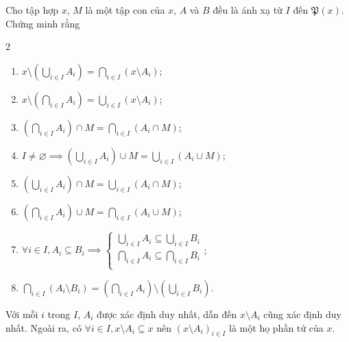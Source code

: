 \exercise Cho tập hợp $x$, $M$ là một tập con của $x$, $A$ và $B$ đều là ánh xạ từ $I$ đến $\mathfrak{P}(x)$. Chứng minh rằng
\begin{multicols}{2}
   \begin{enumerate}
      \item $x \setminus \left(\bigcup_{i \in I}A_i\right) = \bigcap_{i \in I}(x \setminus A_i)$;
      \item $x \setminus \left(\bigcap_{i \in I}A_i\right) = \bigcup_{i \in I}(x \setminus A_i)$;
      \item $\left(\bigcap_{i \in I}A_i\right) \cap M = \bigcap_{i \in I}\left(A_i \cap M\right)$;
      \item $I \neq \varnothing \implies \left(\bigcup_{i \in I}A_i\right) \cup M = \bigcup_{i \in I}\left(A_i \cup M\right)$;
      \item $\left(\bigcup_{i \in I}A_i\right) \cap M = \bigcup_{i \in I}\left(A_i \cap M\right)$;
      \item $\left(\bigcap_{i \in I}A_i\right) \cup M = \bigcap_{i \in I}\left(A_i \cup M\right)$;
      \item $\forall i \in I, A_i \subseteq B_i \implies \begin{cases}
         \bigcup_{i \in I} A_i \subseteq \bigcup_{i \in I}B_i \\
         \bigcap_{i \in I} A_i \subseteq \bigcap_{i \in I}B_i \\
      \end{cases}$;
      \item $\bigcap_{i \in I}\left(A_i \setminus B_i\right) = \left(\bigcap_{i \in I}A_i\right) \setminus \left(\bigcup_{i \in I}B_i\right)$.
   \end{enumerate} 
\end{multicols}

\solution 

\resetSubexercise Với mỗi $i$ trong $I$, $A_i$ được xác định duy nhất, dẫn đến $x \setminus A_i$ cũng xác định duy nhất. Ngoài ra, có $\forall i \in I, x \setminus A_i \subseteq x$ nên $\left(x \setminus A_i\right)_{i \in I}$ là một họ phần tử của $x$.


